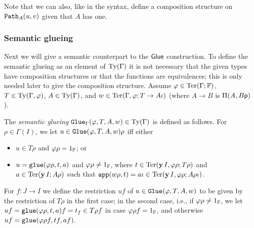 Note that we can also, like in the syntax, define a composition
structure on $\mathtt{Path}_A (u,v)$ given that $A$ has one.


\subsubsection*{Semantic glueing}

Next we will give a semantic counterpart to the ${\sf Glue}$ construction.
To define the semantic glueing as an element of $\operatorname{Ty}(\Gamma)$ it is
not necessary that the given types have composition structures or that
the functions are equivalences; this is only needed later to give the
composition structure.  Assume $\varphi \in \operatorname{Ter}(\Gamma;\mathbb{F})$, $T \in
\operatorname{Ty} (\Gamma,\varphi)$, $A \in \operatorname{Ty} (\Gamma)$, and $w \in
\operatorname{Ter}(\Gamma,\varphi; T \to A \iota)$ (where $A \to B$ is $\Pi
(A,B{\sf p})$).
\begin{definition}
  \label{def:semantic-glue}
  The \emph{semantic glueing} $\operatorname{\mathtt{Glue}}_\Gamma (\varphi,T,A,w) \in \operatorname{Ty}
  (\Gamma)$ is defined as follows. For $\rho \in \Gamma (I)$, we let
  $u \in \operatorname{\mathtt{Glue}} (\varphi,T,A,w) \rho$ if{f} either
  \begin{itemize}
  \item $u \in T \rho$ and $\varphi \rho = 1_{\mathbb{F}}$; or
  \item $u = \operatorname{\mathtt{glue}} (\varphi \rho, t, a)$ and $\varphi \rho \neq
    1_{\mathbb{F}}$, where $t \in \operatorname{Ter} (\operatorname{\mathbf{y}} I, \varphi \rho; T \rho)$ and
    $a \in \operatorname{Ter}(\operatorname{\mathbf{y}} I; A \rho)$ such that $\operatorname{\mathtt{app}} (w \rho,t) = a
    \iota \in \operatorname{Ter} (\operatorname{\mathbf{y}} I, \varphi \rho; A \rho \iota)$.
  \end{itemize}
  For $f \colon J \to I$ we define the restriction $u f$ of $u \in
  \operatorname{\mathtt{Glue}} (\varphi,T,A,w)$ to be given by the restriction of $T \rho$
  in the first case; in the second case, i.e., if $\varphi \rho \neq
  1_{\mathbb{F}}$, we let $u f = \operatorname{\mathtt{glue}} (\varphi \rho, t, a)f = t_f \in T \rho
  f$ in case $\varphi \rho f = 1_{\mathbb{F}}$, and otherwise $u f = \operatorname{\mathtt{glue}}
  (\varphi \rho f, t f, a f)$.
\end{definition}


